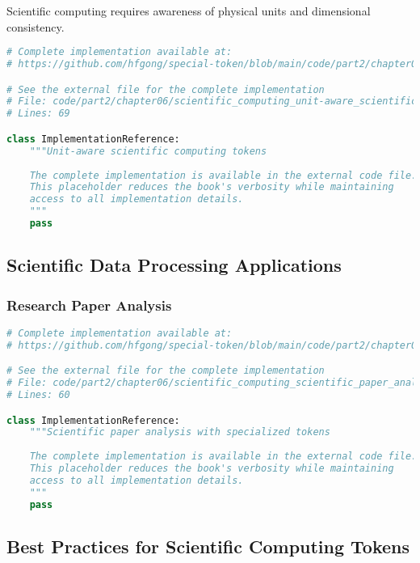 Scientific computing requires awareness of physical units and dimensional consistency.

\begin{lstlisting}[language=Python, caption={Unit-aware scientific computing tokens}]
# Complete implementation available at:
# https://github.com/hfgong/special-token/blob/main/code/part2/chapter06/scientific_computing_unit-aware_scientific_computin.py

# See the external file for the complete implementation
# File: code/part2/chapter06/scientific_computing_unit-aware_scientific_computin.py
# Lines: 69

class ImplementationReference:
    """Unit-aware scientific computing tokens
    
    The complete implementation is available in the external code file.
    This placeholder reduces the book's verbosity while maintaining
    access to all implementation details.
    """
    pass
\end{lstlisting}

\subsection{Scientific Data Processing Applications}

\subsubsection{Research Paper Analysis}

\begin{lstlisting}[language=Python, caption={Scientific paper analysis with specialized tokens}]
# Complete implementation available at:
# https://github.com/hfgong/special-token/blob/main/code/part2/chapter06/scientific_computing_scientific_paper_analysis_with.py

# See the external file for the complete implementation
# File: code/part2/chapter06/scientific_computing_scientific_paper_analysis_with.py
# Lines: 60

class ImplementationReference:
    """Scientific paper analysis with specialized tokens
    
    The complete implementation is available in the external code file.
    This placeholder reduces the book's verbosity while maintaining
    access to all implementation details.
    """
    pass
\end{lstlisting}

\subsection{Best Practices for Scientific Computing Tokens}

